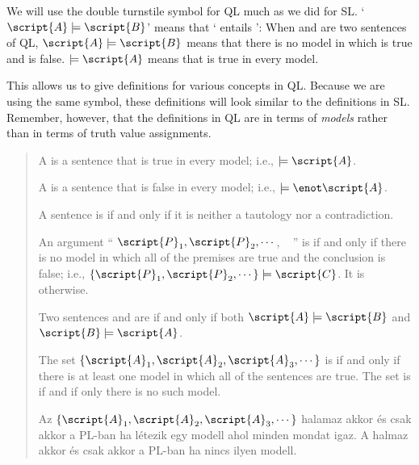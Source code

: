 We will use the double turnstile symbol for QL much as we did for SL. `$\script{A}\models\script{B}$' means that ` entails ': When  and  are two sentences of QL, $\script{A}\models\script{B}$ means that there is no model in which  is true and  is false. $\models\script{A}$ means that  is true in every model.

This allows us to give definitions for various concepts in QL. Because we are using the same symbol, these definitions will look similar to the definitions in SL. Remember, however, that the definitions in QL are in terms of \emph{models} rather than in terms of truth value assignments.

\begin{quote}
A  is a sentence  that is true in every model; i.e.,  $\models\script{A}$.

A  is a sentence  that is false in every model; i.e., $\models\enot\script{A}$.

A sentence is  if and only if it is neither a tautology nor a contradiction.

An argument `` $\script{P}_1, \script{P}_2, \cdots$, \therefore\  '' is  if and only if there is no model in which all of the premises are true and the conclusion is false; i.e., $\{\script{P}_1,\script{P}_2,\cdots\}\models\script{C}$. It is  otherwise.

Two sentences  and  are  if and only if both $\script{A}\models\script{B}$ and $\script{B}\models\script{A}$.



The set $\{\script{A}_1,\script{A}_2,\script{A}_3,\cdots\}$ is  if and only if there is at least one model in which all of the sentences are true. The set is  if and if only there is no such model.

Az $\{\script{A}_1,\script{A}_2,\script{A}_3,\cdots\}$ halamaz akkor és csak akkor  a PL-ban ha létezik egy modell ahol minden mondat igaz. A halmaz akkor és csak akkor  a PL-ban ha nincs ilyen modell.

\end{quote}


